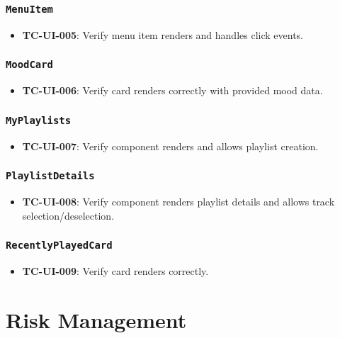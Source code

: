 \documentclass{article}
\begin{document}
\subsubsection{\texttt{MenuItem}}
\begin{itemize}
    \item \textbf{TC-UI-005}: Verify menu item renders and handles click events.
\end{itemize}

\subsubsection{\texttt{MoodCard}}
\begin{itemize}
    \item \textbf{TC-UI-006}: Verify card renders correctly with provided mood data.
\end{itemize}

\subsubsection{\texttt{MyPlaylists}}
\begin{itemize}
    \item \textbf{TC-UI-007}: Verify component renders and allows playlist creation.
\end{itemize}

\subsubsection{\texttt{PlaylistDetails}}
\begin{itemize}
    \item \textbf{TC-UI-008}: Verify component renders playlist details and allows track selection/deselection.
\end{itemize}

\subsubsection{\texttt{RecentlyPlayedCard}}
\begin{itemize}
    \item \textbf{TC-UI-009}: Verify card renders correctly.
\end{itemize}

\section{Risk Management}
\end{document}
